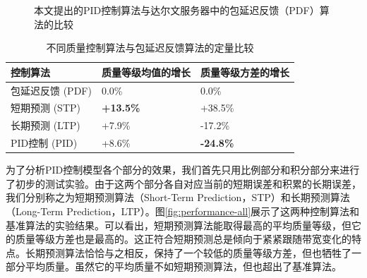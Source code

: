 \begin{figure}[t]
	\centering
	\caption{本文提出的PID控制算法与达尔文服务器中的包延迟反馈（PDF）算法的比较}
	\label{fig:performance-two}
\end{figure}

\begin{table}[ht]
	\centering
	\caption{不同质量控制算法与包延迟反馈算法的定量比较}
	\label{tab:improvement}
	\begin{tabular}[b]{p{4.2cm}<{\centering}|p{4.2cm}<{\centering}|p{4.2cm}<{\centering}}
		\hline \hline
		控制算法 & 质量等级均值的增长 & 质量等级方差的增长 \\ \hline
		包延迟反馈 (PDF) & 0.0\% & 0.0\% \\ \hline
		短期预测 (STP) & \textbf{+13.5\%} & +38.5\% \\ \hline
		长期预测 (LTP) & +7.9\% & -17.2\% \\ \hline
		PID控制 (PID) & +8.6\% & \textbf{-24.8\%} \\ \hline
	\end{tabular}
\end{table}

为了分析PID控制模型各个部分的效果，我们首先只用比例部分和积分部分来进行了初步的测试实验。由于这两个部分各自对应当前的短期误差和积累的长期误差，我们分别称之为短期预测算法（Short-Term Prediction，STP）和长期预测算法（Long-Term Prediction，LTP）。图\ref{fig:performance-all}展示了这两种控制算法和基准算法的实验结果。可以看出，短期预测算法能取得最高的平均质量等级，但它的质量等级方差也是最高的。这正符合短期预测总是倾向于紧紧跟随带宽变化的特点。长期预测算法恰恰与之相反，保持了一个较低的质量等级方差，但也牺牲了一部分平均质量。虽然它的平均质量不如短期预测算法，但也超出了基准算法。

